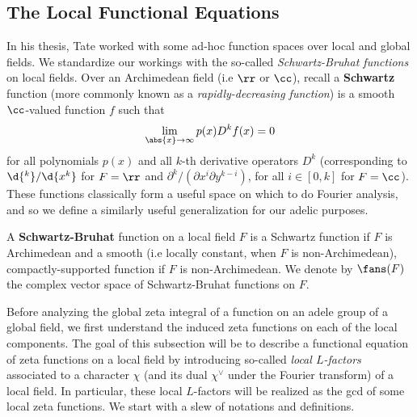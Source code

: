 \documentclass[11pt, x11names, openany]{book}
\begin{document}
\subsection{The Local Functional Equations}
\label{subsection: the local func eqn}

In his thesis, Tate worked with some ad-hoc function spaces over local and global fields. We standardize our workings with the so-called \textit{Schwartz-Bruhat functions} on local fields. Over an Archimedean field (i.e $\rr$ or $\cc$), recall a \textbf{Schwartz} function (more commonly known as a \textit{rapidly-decreasing function}) is a smooth $\cc$-valued function $f$ such that
\begin{equation*}
    \lim_{\abs{x} \to \infty} p(x) D^kf(x) = 0
\end{equation*}
for all polynomials $p(x)$ and all $k$-th derivative operators $D^k$ (corresponding to $\d{^k}/\d{x^k}$ for $F = \rr$ and $\partial^{k}/(\partial x^i \partial y^{k-i})$, for all $i \in [0, k]$ for $F = \cc$). These functions classically form a useful space on which to do Fourier analysis, and so we define a similarly useful generalization for our adelic purposes. 
\begin{defn}
\label{def: Schwartz-Bruhat functions}
A \textbf{Schwartz-Bruhat} function on a local field $F$ is a Schwartz function if $F$ is Archimedean and a smooth (i.e locally constant, when $F$ is non-Archimedean), compactly-supported function if $F$ is non-Archimedean. We denote by $\fans(F)$ the complex vector space of Schwartz-Bruhat functions on $F$.
\end{defn}


Before analyzing the global zeta integral of a function on an adele group of a global field, we first understand the induced zeta functions on each of the local components. The goal of this subsection will be to describe a functional equation of zeta functions on a local field by introducing so-called \textit{local $L$-factors} associated to a character $\chi$ (and its dual $\chi^\lor$ under the Fourier transform) of a local field. In particular, these local $L$-factors will be realized as the gcd of some local zeta functions. We start with a slew of notations and definitions.\\
\end{document}
